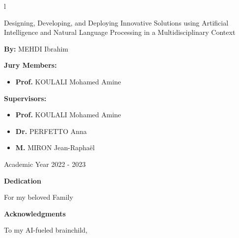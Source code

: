 l\documentclass[a4paper,12pt,twoside]{report}
\begin{document}
\begin{titlepage}
\begin{center}
    \hrulefill\par
    \LARGE Designing, Developing, and Deploying Innovative Solutions using Artificial Intelligence and Natural Language Processing in a Multidisciplinary Context\par
    \hrulefill\par
\end{center}
\vfill

\begin{center}
\textbf{By:}
    MEHDI Ibrahim

\end{center}

\vfill


\begin{multicols}{2}
\noindent \textbf{Jury Members:}
\begin{itemize}[label=\textbullet, leftmargin=*]
  \item \textbf{Prof.} KOULALI Mohamed Amine
\end{itemize}

\columnbreak

\noindent \textbf{Supervisors:}
\begin{itemize}[label=\textbullet, leftmargin=*]
  \item \textbf{Prof.} KOULALI Mohamed Amine
  \item \textbf{Dr.} PERFETTO Anna
  \item \textbf{M.} MIRON Jean-Raphaël
\end{itemize}

\end{multicols}

\begin{center}
    Academic Year 2022 - 2023
\end{center}

\end{titlepage}

\newpage

\begin{center}
    \Large{\textbf{Dedication}}
\end{center}


\begin{center}
    \Large{For my beloved Family}
\end{center}
\newpage
\thispagestyle{empty}
\begin{center}
    \Large\textbf{Acknowledgments}
\end{center}
To my AI-fueled brainchild,
\end{document}
